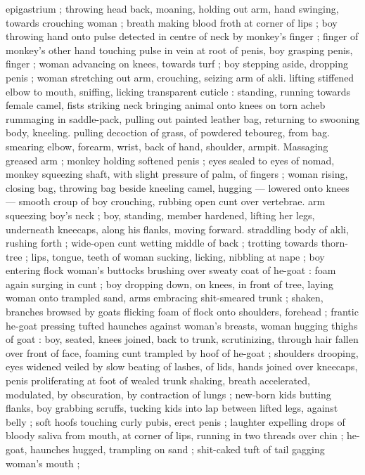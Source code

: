 epigastrium ; throwing head back, moaning, holding out arm, hand 
swinging, towards crouching woman ; breath making blood froth at 
corner of lips ; boy throwing hand onto pulse detected in centre of 
neck by monkey's finger ; finger of monkey's other hand touching 
pulse in vein at root of penis, boy grasping penis, finger ; woman 
advancing on knees, towards turf ; boy stepping aside, dropping 
penis ; woman stretching out arm, crouching, seizing arm of akli. 
lifting stiffened elbow to mouth, sniffing, licking transparent cuticle : 
standing, running towards female camel, fists striking neck bringing 
animal onto knees on torn acheb rummaging in saddle-pack, pulling 
out painted leather bag, returning to swooning body, kneeling. 
pulling decoction of grass, of powdered teboureg, from bag. 
smearing elbow, forearm, wrist, back of hand, shoulder, armpit. 
Massaging greased arm ; monkey holding softened penis ; eyes 
sealed to eyes of nomad, monkey squeezing shaft, with slight 
pressure of palm, of fingers ; woman rising, closing bag, throwing 
bag beside kneeling camel, hugging --- lowered onto knees --- 
smooth croup of boy crouching, rubbing open cunt over vertebrae. 
arm squeezing boy's neck ; boy, standing, member hardened, lifting 
her legs, underneath kneecaps, along his flanks, moving forward. 
straddling body of akli, rushing forth ; wide-open cunt wetting 
middle of back ; trotting towards thorn-tree ; lips, tongue, teeth of 
woman sucking, licking, nibbling at nape ; boy entering flock {\gl} 
woman's buttocks brushing over sweaty coat of he-goat : foam again 
surging in cunt ; boy dropping down, on knees, in front of tree, 
laying woman onto trampled sand, arms embracing shit-smeared 
trunk ; shaken, branches browsed by goats flicking foam of flock 
onto shoulders, forehead ; frantic he-goat pressing tufted haunches 
against woman's breasts, woman hugging thighs of goat : boy, 
seated, knees joined, back to trunk, scrutinizing, through hair fallen 
over front of face, foaming cunt trampled by hoof of he-goat ; 
shoulders drooping, eyes widened veiled by slow beating of lashes, 
of lids, hands joined over kneecaps, penis proliferating at foot of 
wealed trunk shaking, breath accelerated, modulated, by 
obscuration, by contraction of lungs ; new-born kids butting flanks, 
boy grabbing scruffs, tucking kids into lap between lifted legs, 
against belly ; soft hoofs touching curly pubis, erect penis ; laughter 
expelling drops of bloody saliva from mouth, at corner of lips, 
running in two threads over chin ; he-goat, haunches hugged, 
trampling on sand ; shit-caked tuft of tail gagging woman's mouth ; 
